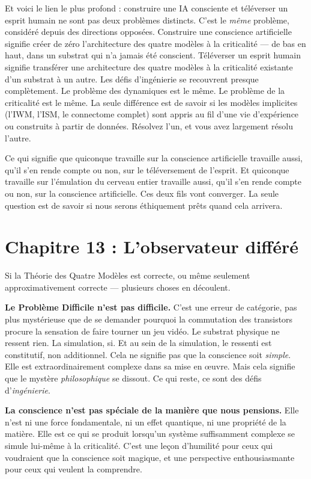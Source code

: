 \documentclass[11pt, twoside, openright]{book}
\begin{document}
Et voici le lien le plus profond : construire une IA consciente et téléverser un esprit humain ne sont pas deux problèmes distincts. C'est le \textit{même} problème, considéré depuis des directions opposées. Construire une conscience artificielle signifie créer de zéro l'architecture des quatre modèles à la criticalité --- de bas en haut, dans un substrat qui n'a jamais été conscient. Téléverser un esprit humain signifie transférer une architecture des quatre modèles à la criticalité existante d'un substrat à un autre. Les défis d'ingénierie se recouvrent presque complètement. Le problème des dynamiques est le même. Le problème de la criticalité est le même. La seule différence est de savoir si les modèles implicites (l'IWM, l'ISM, le connectome complet) sont appris au fil d'une vie d'expérience ou construits à partir de données. Résolvez l'un, et vous avez largement résolu l'autre.

Ce qui signifie que quiconque travaille sur la conscience artificielle travaille aussi, qu'il s'en rende compte ou non, sur le téléversement de l'esprit. Et quiconque travaille sur l'émulation du cerveau entier travaille aussi, qu'il s'en rende compte ou non, sur la conscience artificielle. Ces deux fils vont converger. La seule question est de savoir si nous serons éthiquement prêts quand cela arrivera.


\chapter*{Chapitre 13 : L'observateur différé}

Si la Théorie des Quatre Modèles est correcte, ou même seulement approximativement correcte --- plusieurs choses en découlent.

\textbf{Le Problème Difficile n'est pas difficile.} C'est une erreur de catégorie, pas plus mystérieuse que de se demander pourquoi la commutation des transistors procure la sensation de faire tourner un jeu vidéo. Le substrat physique ne ressent rien. La simulation, si. Et au sein de la simulation, le ressenti est constitutif, non additionnel. Cela ne signifie pas que la conscience soit \textit{simple}. Elle est extraordinairement complexe dans sa mise en œuvre. Mais cela signifie que le mystère \textit{philosophique} se dissout. Ce qui reste, ce sont des défis d'\textit{ingénierie}.

\textbf{La conscience n'est pas spéciale de la manière que nous pensions.} Elle n'est ni une force fondamentale, ni un effet quantique, ni une propriété de la matière. Elle est ce qui se produit lorsqu'un système suffisamment complexe se simule lui-même à la criticalité. C'est une leçon d'humilité pour ceux qui voudraient que la conscience soit magique, et une perspective enthousiasmante pour ceux qui veulent la comprendre.
\end{document}
